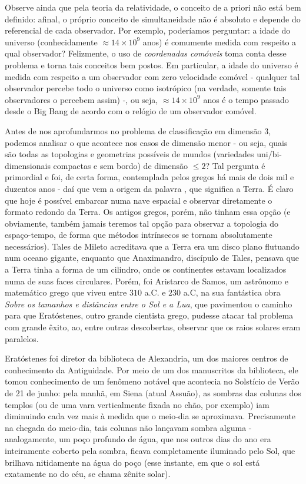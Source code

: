   Observe ainda que pela teoria da relatividade, o conceito de  a priori não está bem definido: afinal, o próprio conceito de simultaneidade não é absoluto e depende do referencial de cada observador. Por exemplo, poderíamos perguntar: a idade do universo (conhecidamente $\approx 14 \times 10^9$ anos) é comumente medida com respeito a qual observador? Felizmente, o uso de \emph{coordenadas comóveis} toma conta desse problema e torna tais conceitos bem postos. Em particular, a idade do universo é medida com respeito a um observador com zero velocidade comóvel - qualquer tal observador percebe todo o universo como isotrópico (na verdade, somente tais observadores o percebem assim) -, ou seja, $ \approx 14 \times 10^9$ anos é o tempo passado desde o Big Bang de acordo com o relógio de um observador comóvel. \par 
Antes de nos aprofundarmos no problema de classificação em dimensão $3$, podemos analisar o que acontece nos casos de dimensão menor - ou seja, quais são todas as topologias e geometrias possíveis de mundos (variedades uni/bi-dimensionais compactas e sem bordo) de dimensão $\leq 2$? Tal pergunta é primordial e foi, de certa forma, contemplada pelos gregos há mais de dois mil e duzentos anos - daí que vem a origem da palavra , que significa  a Terra. É claro que hoje é possível embarcar numa nave espacial e observar diretamente o formato redondo da Terra. Os antigos gregos, porém, não tinham essa opção (e obviamente, também jamais teremos tal opção para observar a topologia do espaço-tempo, de forma que métodos intrínsecos se tornam absolutamente necessários). Tales de Mileto acreditava que a Terra era um disco plano flutuando num oceano gigante, enquanto que Anaximandro, discípulo de Tales, pensava que a Terra tinha a forma de um cilindro, onde os continentes estavam localizados numa de suas faces circulares. Porém, foi Aristarco de Samos, um astrônomo e matemático grego que viveu entre $310$ a.C. e $230$ a.C, na sua fantástica obra \emph{Sobre os tamanhos e distâncias entre o Sol e a Lua}, que pavimentou o caminho para que Eratóstenes, outro grande cientista grego, pudesse atacar tal problema com grande êxito, ao, entre outras descobertas, observar que os raios solares eram paralelos. \par 
Eratóstenes foi diretor da biblioteca de Alexandria, um dos maiores centros de conhecimento da Antiguidade. Por meio de um dos manuscritos da biblioteca, ele tomou conhecimento de um fenômeno notável que acontecia no Solstício de Verão de 21 de junho: pela manhã, em Siena (atual Assuão), as sombras das colunas dos templos (ou de uma vara verticalmente fixada no chão, por exemplo) iam diminuindo cada vez mais à medida que o meio-dia se aproximava. Precisamente na chegada do meio-dia, tais colunas não lançavam sombra alguma - analogamente, um poço profundo de água, que nos outros dias do ano era inteiramente coberto pela sombra, ficava completamente iluminado pelo Sol, que brilhava nitidamente na água do poço (esse instante, em que o sol está exatamente no  do céu, se chama zênite solar). \par 
